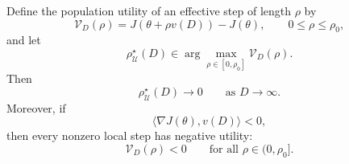\begin{lemma}
Define the population utility of an effective step of length \(\rho\) by
\begin{equation}
    \mathcal V_D(\rho)
    =
    J\!\left(
        \theta+\rho v(D)
    \right)
    -
    J(\theta),
    \qquad
    0\leq\rho\leq\rho_0,
    \label{eq:effective_step_utility}
\end{equation}
and let
\begin{equation}
    \rho_{\mathcal U}^{\star}(D)
    \in
    \arg\max_{\rho\in[0,\rho_0]}
    \mathcal V_D(\rho).
    \label{eq:utility_optimal_effective_step}
\end{equation}
Then
\begin{equation}
    \rho_{\mathcal U}^{\star}(D)
    \longrightarrow 0
    \qquad
    \text{as }
    D\longrightarrow\infty.
    \label{eq:optimal_step_vanishes}
\end{equation}
Moreover, if
\[
    \langle\nabla J(\theta),v(D)\rangle<0,
\]
then every nonzero local step has negative utility:
\begin{equation}
    \mathcal V_D(\rho)<0
    \qquad
    \text{for all }
    \rho\in(0,\rho_0].
    \label{eq:negative_far_field_utility}
\end{equation}
\end{lemma}

